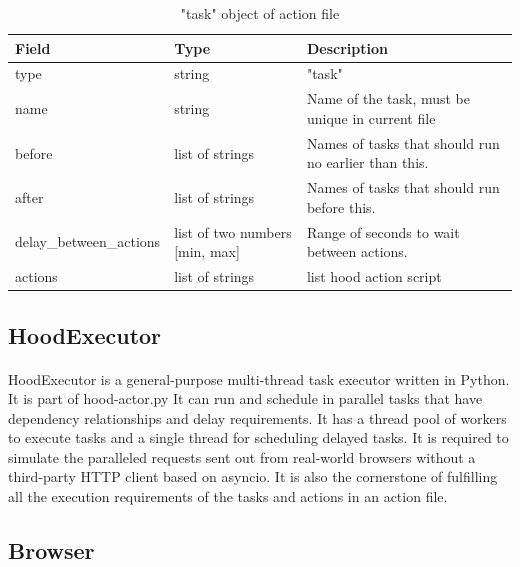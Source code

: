 \documentclass[mscthesis]{usiinfthesis}
\begin{document}
\begin{table}[H]
  \centering
  \begin{tabular}{|p{34mm}|p{26mm}|p{65mm}|}
    \hline
    Field                   & Type                           & Description                                          \\
    \hline
    type                    & string                         & "task"                                               \\
    name                    & string                         & Name of the task, must be unique in current file     \\
    before                  & list of strings                & Names of tasks that should run no earlier than this. \\
    after                   & list of strings                & Names of tasks that should run before this.          \\
    delay\_between\_actions & list of two numbers [min, max] & Range of seconds to wait between actions.            \\
    actions                 & list of strings                & list hood action script                              \\
    \hline
  \end{tabular}
  \caption{"task" object of action file}
  \label{tab:task_object}
\end{table}

\subsection{HoodExecutor}
\paragraph{}
HoodExecutor is a general-purpose multi-thread task executor written in Python. It is part of hood-actor.py It can run and schedule in parallel tasks that have dependency relationships and delay requirements. It has a thread pool of workers to execute tasks and a single thread for scheduling delayed tasks. It is required to simulate the paralleled requests sent out from real-world browsers without a third-party HTTP client based on asyncio. It is also the cornerstone of fulfilling all the execution requirements of the tasks and actions in an action file.

\subsection{Browser}\label{sec:browser}
\end{document}
